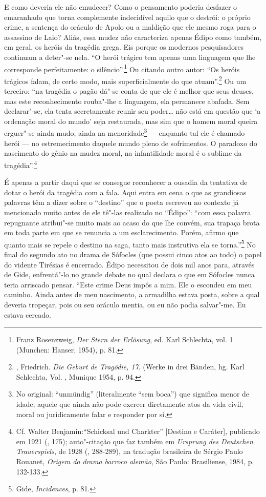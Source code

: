 E como deveria ele não emudecer? Como o pensamento poderia desfazer o
emaranhado que torna complemente indecidível aquilo que o destrói: o
próprio crime, a sentença do oráculo de Apolo ou a maldição que ele
mesmo roga para o assassino de Laio? Aliás, essa mudez não caracteriza
apenas Édipo como também, em geral, os heróis da tragédia grega. Eis
porque os modernos pesquisadores continuam a deter"-se nela. ``O herói
trágico tem apenas uma linguagem que lhe corresponde perfeitamente: o
silêncio''.\footnote{Franz Rosenzweig, \emph{Der Stern der
  Erlösung}, ed. Karl Schlechta, vol. 1 (Munchen: Hanser, 1954), p. 81. \versal{[N. E.]}}
Ou citando outro autor: ``Os heróis trágicos falam, de certo modo, mais
superficialmente do que atuam''.\footnote{, Friedrich.
  \emph{Die Geburt de Tragödie, 17}. (Werke in drei Bänden, hg.
  Karl Schlechta, Vol. , Munique 1954, p. 94. \versal{[N. E.]}} Ou um terceiro: ``na
tragédia o pagão dá"-se conta de que ele é melhor que seus deuses, mas
este reconhecimento rouba"-lhe a linguagem, ela permanece abafada. Sem
declarar"-se, ela tenta secretamente reunir seu poder\ldots{} não está em
questão que `a ordenação moral do mundo' seja restaurada, mas sim que o
homem moral queira erguer"-se ainda mudo, ainda na menoridade\footnote{No original: ``unmündig'' (literalmente ``sem boca'') que significa
  menor de idade, aquele que ainda não pode exercer diretamente atos da
  vida civil, moral ou juridicamente falar e responder por si. \versal{[N. T.]}} ---
enquanto tal ele é chamado herói --- no estremecimento daquele mundo
pleno de sofrimentos. O paradoxo do nascimento do gênio na mudez moral,
na infantilidade moral é o sublime da tragédia''.\footnote{Cf.
  Walter Benjamin:``Schicksal und Charkter'' {[}Destino e Caráter{]},
  publicado em 1921 (, 175); auto"-citação que faz também em
  \emph{Ursprung des Deutschen Trauerspiels}, de 1928 (, 288-289),
  na tradução brasileira de Sérgio Paulo Rouanet, \emph{Origem do drama
  barroco alemão}, São Paulo: Brasiliense, 1984, p. 132-133. \versal{[N. T.]}}

É apenas a partir daqui que se consegue reconhecer a ousadia da
tentativa de dotar o herói da tragédia com a fala. Aqui entra em cena o
que as grandiosas palavras têm a dizer sobre o ``destino'' que o poeta
escreveu no contexto já mencionado muito antes de ele tê"-las realizado
no ``Édipo'': ``com essa palavra repugnante atribui"-se muito mais ao
acaso do que lhe convém, sua trapaça brota em toda parte em que se
renuncia a um esclarecimento. Porém, afirmo que quanto mais se repele o
destino na saga, tanto mais instrutiva ela se torna.''\footnote{Gide, \emph{Incidences}, p. 81. \versal{[N. T.]}} No final do segundo ato no drama de
Sófocles (que possui cinco atos ao todo) o papel do vidente Tirésias é
encerrado. Édipo necessitou de dois mil anos para, através de Gide,
enfrentá"-lo no grande debate no qual declara o que em Sófocles nunca
teria arriscado pensar. ``Este crime Deus impôs a mim. Ele o escondeu em
meu caminho. Ainda antes de meu nascimento, a armadilha estava posta,
sobre a qual deveria tropeçar, pois ou seu oráculo mentia, ou eu não
podia salvar"-me. Eu estava cercado.

